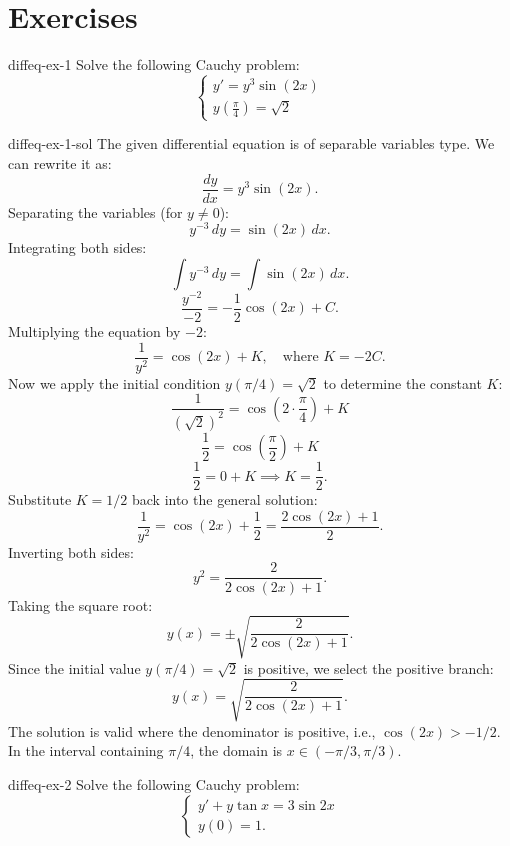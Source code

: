 \documentclass[preview]{standalone}
\begin{document}
\genpage

\section{Exercises}

\begin{snippetexercise}{diffeq-ex-1}{}
    Solve the following Cauchy problem:
    \[
        \begin{cases}
        y' = y^3 \sin(2x) \\
        y\left(\frac{\pi}{4}\right) = \sqrt{2}
        \end{cases}
    \]
\end{snippetexercise}

\begin{snippetsolution}{diffeq-ex-1-sol}{}
    The given differential equation is of separable variables type. We can rewrite it as:
    \[ \frac{dy}{dx} = y^3 \sin(2x). \]
    Separating the variables (for \( y \neq 0 \)):
    \[ y^{-3} \, dy = \sin(2x) \, dx. \]
    Integrating both sides:
    \[ \int y^{-3} \, dy = \int \sin(2x) \, dx. \]
    \[ \frac{y^{-2}}{-2} = -\frac{1}{2} \cos(2x) + C. \]
    Multiplying the equation by \(-2\):
    \[ \frac{1}{y^2} = \cos(2x) + K, \quad \text{where } K = -2C. \]
    Now we apply the initial condition \( y(\pi/4) = \sqrt{2} \) to determine the constant \( K \):
    \[ \frac{1}{(\sqrt{2})^2} = \cos\left(2 \cdot \frac{\pi}{4}\right) + K \]
    \[ \frac{1}{2} = \cos\left(\frac{\pi}{2}\right) + K \]
    \[ \frac{1}{2} = 0 + K \implies K = \frac{1}{2}. \]
    Substitute \( K = 1/2 \) back into the general solution:
    \[ \frac{1}{y^2} = \cos(2x) + \frac{1}{2} = \frac{2\cos(2x) + 1}{2}. \]
    Inverting both sides:
    \[ y^2 = \frac{2}{2\cos(2x) + 1}. \]
    Taking the square root:
    \[ y(x) = \pm \sqrt{\frac{2}{2\cos(2x) + 1}}. \]
    Since the initial value \( y(\pi/4) = \sqrt{2} \) is positive, we select the positive branch:
    \[ y(x) = \sqrt{\frac{2}{2\cos(2x) + 1}}. \]
    The solution is valid where the denominator is positive, i.e., \( \cos(2x) > -1/2 \). In the interval containing \( \pi/4 \), the domain is \( x \in (-\pi/3, \pi/3) \).
\end{snippetsolution}

\begin{snippetexercise}{diffeq-ex-2}{}
    Solve the following Cauchy problem:
    \[
        \begin{cases}
        y' + y \tan x = 3 \sin 2x \\
        y(0) = 1.
        \end{cases}
    \]
\end{snippetexercise}
\end{document}
